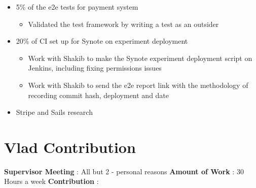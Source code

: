 \begin{itemize}
	\item 5\% of the e2e tests for payment system
		\begin{itemize}
			\item Validated the test framework by writing a test as an outsider
		\end{itemize}
	\item 20\% of CI set up for Synote on experiment deployment
		\begin{itemize}
			\item Work with Shakib to make the Synote experiment deployment script on Jenkins, including fixing permissions issues
			\item Work with Shakib to send the e2e report link with the methodology of recording commit hash, deployment and date
		\end{itemize}
	\item Stripe and Sails research
\end{itemize}

\section{Vlad Contribution}
\label{sec:vlad-contribution}
\textbf{Supervisor Meeting} : All but 2 - personal reasons
\newline
\textbf{Amount of Work} : 30 Hours a week
\newline
\textbf{Contribution} :

